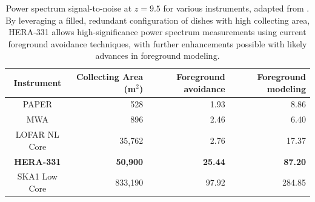 \documentclass[preprint]{aastex}
\begin{document}
\begin{table}
\centering
\begin{tabular}{c||r||r|r} 
Instrument & Collecting Area (m$^2$) & Foreground avoidance & Foreground modeling \\
\hline
PAPER & 528 & 1.93 & 8.86 \\
MWA & 896 & 2.46 & 6.40 \\
LOFAR NL Core & 35,762 & 2.76 & 17.37 \\
\textbf{HERA-331} & \textbf{50,900} & \textbf{25.44} & \textbf{87.20} \\
SKA1 Low Core & 833,190 & 97.92 & 284.85 \\
\end{tabular}
\caption{Power spectrum signal-to-noise at $z=9.5$ for various instruments, adapted from \citet{pober_et_al2014}.  By leveraging a filled, redundant configuration of dishes with high collecting area, HERA-331 allows high-significance power spectrum measurements using current foreground avoidance techniques, with further enhancements possible with likely advances in foreground modeling.}
\label{tab:signif}
\end{table}


%
\end{document}
